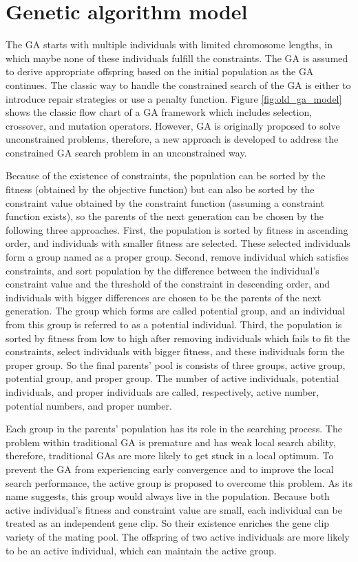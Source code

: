 \section{Genetic algorithm model}



The GA starts with multiple individuals with limited chromosome lengths, in
which maybe none of these individuals fulfill the constraints. The GA is
assumed to derive appropriate offspring based on the initial population as the
GA continues. The classic way to handle the constrained search of the GA is
either to introduce repair strategies or use a penalty function. Figure
\ref{fig:old_ga_model} shows the classic flow chart of a GA framework which
includes selection, crossover, and mutation operators. However, GA is originally
proposed to solve unconstrained problems, therefore, a new approach is
developed to address the constrained GA search problem in an unconstrained way. 

Because of the existence of constraints, the population can be sorted by the
fitness (obtained by the objective function) but can also be sorted by the
constraint value obtained by the constraint function (assuming a constraint
function exists), so the parents of the next generation can be chosen by the
following three approaches. First, the population is sorted by fitness 
in ascending order, and individuals with smaller fitness are selected. These
selected individuals form a group named as a proper group. Second, remove
individual which satisfies constraints, and sort population by the difference
between the individual's constraint value and the threshold of the constraint
in descending order, and individuals with bigger differences are chosen to be
the parents of the next generation. The group which forms are called potential
group, and an individual from this group is referred to as a potential individual.
Third, the population is sorted by fitness from low to high after removing
individuals which fails to fit the constraints, select individuals with bigger
fitness, and these individuals form the proper group.  So the final parents'
pool is consists of three groups, active group, potential group, and proper
group.  The number of active individuals, potential individuals, and proper
individuals are called, respectively, active number, potential numbers, and
proper number. 

Each group in the parents' population has its role in the searching
process. The problem within traditional GA is premature and has weak local
search ability, therefore, traditional GAs are more likely to get stuck in a
local optimum. To prevent the GA from experiencing early convergence and to
improve the local search performance, the active group is proposed to overcome
this problem. As its name suggests, this group would always live in the
population.  Because both active individual's fitness and constraint value are small,
each individual can be treated as an independent gene clip. So their existence
enriches the gene clip variety of the mating pool. The offspring of two active
individuals are more likely to be an active individual, which can maintain the
active group.

